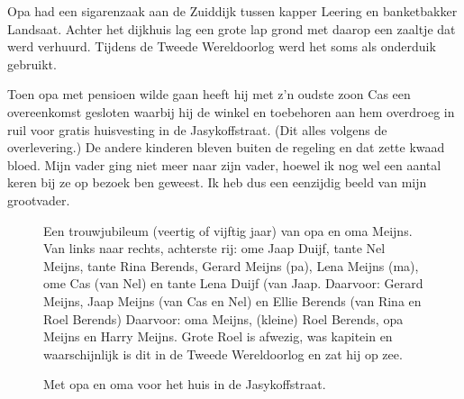 \documentclass[10pt,twoside, openright]{memoir}
\begin{document}
Opa had een sigarenzaak aan de Zuiddijk tussen kapper Leering en banketbakker Landsaat. Achter het dijkhuis lag een grote lap grond met daarop een zaaltje dat werd verhuurd. Tijdens de Tweede Wereldoorlog werd het soms als onderduik gebruikt. 

Toen opa met pensioen wilde gaan heeft hij met z’n oudste zoon Cas een overeenkomst gesloten waarbij hij de winkel en toebehoren aan hem overdroeg in ruil voor gratis huisvesting in de Jasykoffstraat. (Dit alles volgens de overlevering.) De andere kinderen bleven buiten de regeling en dat zette kwaad bloed. Mijn vader ging niet meer naar zijn vader, hoewel ik nog wel een aantal keren bij ze op bezoek ben geweest. Ik heb dus een eenzijdig beeld van mijn grootvader.

\begin{figure}
\caption*{\footnotesize Een trouwjubileum (veertig of vijftig jaar) van opa en oma Meijns. Van links naar rechts, achterste rij: ome Jaap Duijf, tante Nel Meijns, tante Rina Berends, Gerard Meijns (pa), Lena Meijns (ma), ome Cas (van Nel) en tante Lena Duijf (van Jaap.
Daarvoor: Gerard Meijns, Jaap Meijns (van Cas en Nel) en Ellie Berends (van Rina en Roel Berends)
Daarvoor: oma Meijns, (kleine) Roel Berends, opa Meijns en Harry Meijns. Grote Roel is afwezig, was kapitein en waarschijnlijk is dit in de Tweede Wereldoorlog en zat hij op zee.}
\end{figure}

\begin{figure}
\caption*{\footnotesize Met opa en oma voor het huis in de Jasykoffstraat.}
\end{figure}
\end{document}

